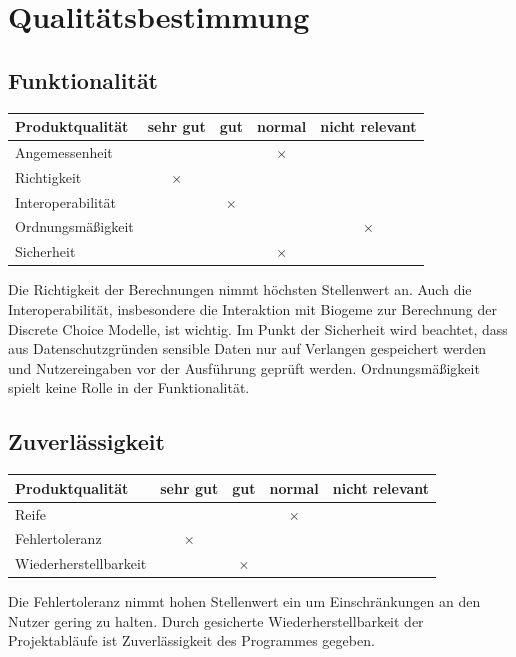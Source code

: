\documentclass{article}
\begin{document}
\clearpage
\section{Qualitätsbestimmung}
\subsection{Funktionalität}
\begin{table}[H]
\centering
\begin{tabular}{lcccc}
\hline
\textbf{Produktqualität} & sehr gut & gut      & normal   & nicht relevant \\ \hline
Angemessenheit           &          &          & $\times$ &                \\
Richtigkeit              & $\times$ &          &          &                \\
Interoperabilität        &          & $\times$ &          &                \\
Ordnungsmäßigkeit        &          &          &          & $\times$       \\
Sicherheit               &          &          & $\times$ &                \\  
\end{tabular}
\end{table}
Die Richtigkeit der Berechnungen nimmt höchsten Stellenwert an. Auch die Interoperabilität, insbesondere die Interaktion mit Biogeme zur Berechnung der Discrete Choice Modelle, ist wichtig. Im Punkt der Sicherheit wird beachtet, dass aus Datenschutzgründen sensible Daten nur auf Verlangen gespeichert werden und Nutzereingaben vor der Ausführung geprüft werden. Ordnungsmäßigkeit spielt keine Rolle in der Funktionalität.

\subsection{Zuverlässigkeit}
\begin{table}[H]
\centering
\begin{tabular}{lcccc}
\hline
\textbf{Produktqualität} & sehr gut & gut      & normal   & nicht relevant \\ \hline
Reife                    &          &          & $\times$ &                \\
Fehlertoleranz           & $\times$ &          &          &                \\
Wiederherstellbarkeit    &          & $\times$ &          &                \\
\end{tabular}
\end{table}
Die Fehlertoleranz nimmt hohen Stellenwert ein um Einschränkungen an den Nutzer gering zu halten. Durch gesicherte Wiederherstellbarkeit der Projektabläufe ist Zuverlässigkeit des Programmes gegeben. 
\end{document}
